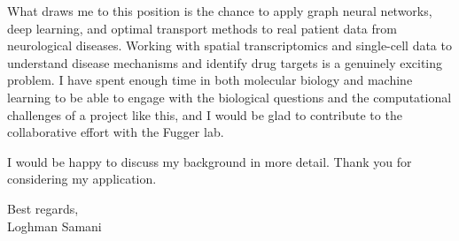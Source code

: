 \documentclass[a4paper,11pt]{article}
\begin{document}
What draws me to this position is the chance to apply graph neural networks, deep learning, and optimal transport methods to real patient data from neurological diseases. Working with spatial transcriptomics and single-cell data to understand disease mechanisms and identify drug targets is a genuinely exciting problem. I have spent enough time in both molecular biology and machine learning to be able to engage with the biological questions and the computational challenges of a project like this, and I would be glad to contribute to the collaborative effort with the Fugger lab.

I would be happy to discuss my background in more detail. Thank you for considering my application.

\vspace{6mm}

Best regards, \\
Loghman Samani
\end{document}
